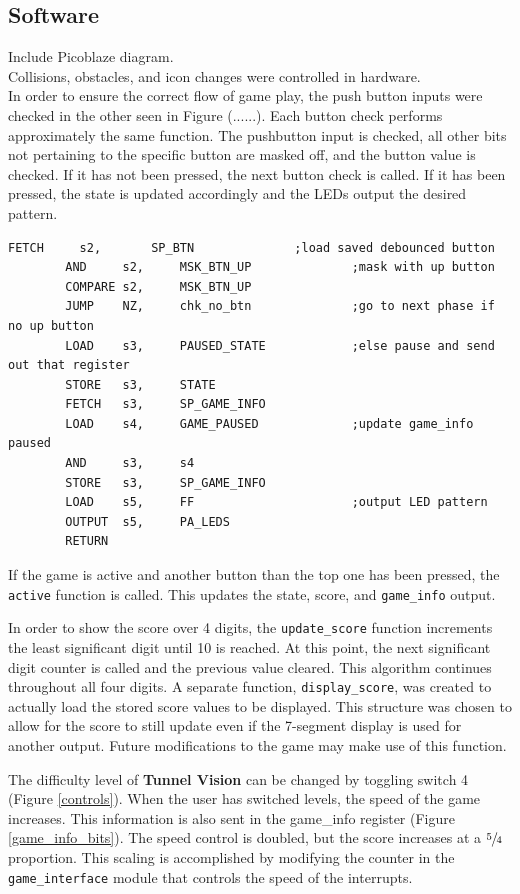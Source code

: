 \documentclass[11pt]{article}
\begin{document}
\subsection{Software}

Include Picoblaze diagram. \\ 
Collisions, obstacles, and icon changes were controlled in hardware.\\

In order to ensure the correct flow of game play, the push button inputs were checked in the other seen in Figure (......).  Each button check performs approximately the same function.  The pushbutton input is checked, all other bits not pertaining to the specific button are masked off, and the button value is checked.  If it has not been pressed, the next button check is called.  If it has been pressed, the state is updated accordingly and the LEDs output the desired pattern. 


\begin{lstlisting}[caption=Function checking if the top button has been pushed, label=chk_up_btn]		
		FETCH	  s2,		SP_BTN				;load saved debounced button
		AND		s2,		MSK_BTN_UP				;mask with up button
		COMPARE s2,		MSK_BTN_UP
		JUMP 	NZ, 	chk_no_btn				;go to next phase if no up button
		LOAD 	s3,		PAUSED_STATE			;else pause and send out that register
		STORE	s3,		STATE
		FETCH	s3,		SP_GAME_INFO
		LOAD 	s4,	    GAME_PAUSED        		;update game_info paused	
		AND		s3,		s4						
		STORE	s3,		SP_GAME_INFO
		LOAD	s5,		FF						;output LED pattern
		OUTPUT	s5,		PA_LEDS
		RETURN	
 \end{lstlisting}


If the game is active and another button than the top one has been pressed, the \texttt{active} function is called.  This updates the state, score, and \texttt{game\_info} output.  

 In order to show the score over 4 digits, the \texttt{update\_score} function increments the least significant digit until 10 is reached.  At this point, the next significant digit counter is called and the previous value cleared.  This algorithm continues throughout all four digits. A separate function, \texttt{display\_score}, was created to actually load the stored score values to be displayed.  This structure was chosen to allow for the score to still update even if the 7-segment display is used for another output.  Future modifications to the game may make use of this function.
		
		
The difficulty level of \textbf{Tunnel Vision} can be changed by toggling switch 4 (Figure \ref{controls}). When the user has switched levels, the speed of the game increases.  This information is also sent in the game\_info register (Figure \ref{game_info_bits}).  The speed control is doubled, but the score increases at a $\sfrac{5}{4}$ proportion.  This scaling is accomplished by modifying the counter in the \texttt{game\_interface} module that controls the speed of the interrupts.
\end{document}
